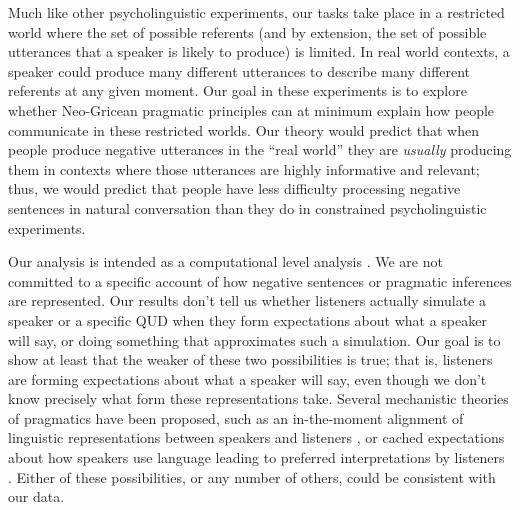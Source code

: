 \documentclass[man, floatsintext, noapacite]{apa6}
\begin{document}
Much like other psycholinguistic experiments, our tasks take place in a restricted world where the set of possible referents (and by extension, the set of possible utterances that a speaker is likely to produce) is limited. In real world contexts, a speaker could produce many different utterances to describe many different referents at any given moment. Our goal in these experiments is to explore whether Neo-Gricean pragmatic principles can at minimum explain how people communicate in these restricted worlds. Our theory would predict that when people produce negative utterances in the ``real world'' they are \textit{usually} producing them in contexts where those utterances are highly informative and relevant; thus, we would predict that people have less difficulty processing negative sentences in natural conversation than they do in constrained psycholinguistic experiments.


Our analysis is intended as a computational level analysis \cite{marr1982}. We are not committed to a specific account of how negative sentences or pragmatic inferences are represented. Our results don't tell us whether listeners actually simulate a speaker or a specific QUD when they form expectations about what a speaker will say, or doing something that approximates such a simulation. Our goal is to show at least that the weaker of these two possibilities is true; that is, listeners are forming expectations about what a speaker will say, even though we don't know precisely what form these representations take. Several mechanistic theories of pragmatics have been proposed, such as an in-the-moment alignment of linguistic representations between speakers and listeners \cite{pickering2004}, or cached expectations about how speakers use language leading to preferred interpretations by listeners \cite{levinson2000}. Either of these possibilities, or any number of others, could be consistent with our data. 
\end{document}
